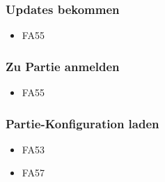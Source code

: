 \subsubsection{Updates bekommen}
\begin{itemize} 
	\item FA55
\end{itemize}
\subsubsection{Zu Partie anmelden}
\begin{itemize} 
	\item FA55
\end{itemize}
\subsubsection{Partie-Konfiguration laden}
\begin{itemize} 
	\item FA53
	\item FA57
\end{itemize}
